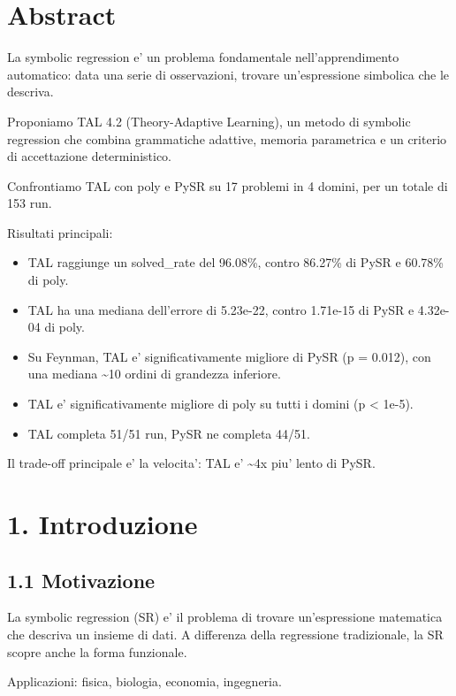 \documentclass[
]{article}
\providecommand{\tightlist}{%
  \setlength{\itemsep}{0pt}\setlength{\parskip}{0pt}}
\begin{document}
\section{Abstract}\label{abstract}

La symbolic regression e' un problema fondamentale nell'apprendimento
automatico: data una serie di osservazioni, trovare un'espressione
simbolica che le descriva.

Proponiamo TAL 4.2 (Theory-Adaptive Learning), un metodo di symbolic
regression che combina grammatiche adattive, memoria parametrica e un
criterio di accettazione deterministico.

Confrontiamo TAL con poly e PySR su 17 problemi in 4 domini, per un
totale di 153 run.

Risultati principali:

\begin{itemize}
\tightlist
\item
  TAL raggiunge un solved\_rate del 96.08\%, contro 86.27\% di PySR e
  60.78\% di poly.
\item
  TAL ha una mediana dell'errore di 5.23e-22, contro 1.71e-15 di PySR e
  4.32e-04 di poly.
\item
  Su Feynman, TAL e' significativamente migliore di PySR (p = 0.012),
  con una mediana \textasciitilde10 ordini di grandezza inferiore.
\item
  TAL e' significativamente migliore di poly su tutti i domini (p
  \textless{} 1e-5).
\item
  TAL completa 51/51 run, PySR ne completa 44/51.
\end{itemize}

Il trade-off principale e' la velocita': TAL e' \textasciitilde4x piu'
lento di PySR.

\section{1. Introduzione}\label{introduzione}

\subsection{1.1 Motivazione}\label{motivazione}

La symbolic regression (SR) e' il problema di trovare un'espressione
matematica che descriva un insieme di dati. A differenza della
regressione tradizionale, la SR scopre anche la forma funzionale.

Applicazioni: fisica, biologia, economia, ingegneria.
\end{document}
